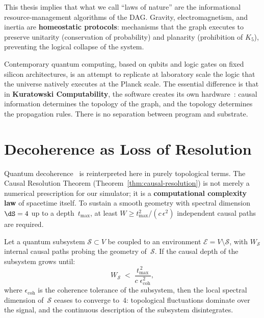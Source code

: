 \medskip\noindent
This thesis implies that what we call ``laws of nature'' are the
informational resource-management algorithms of the DAG. Gravity,
electromagnetism, and inertia are \textbf{homeostatic protocols}:
mechanisms that the graph executes to preserve unitarity (conservation of
probability) and planarity (prohibition of $K_5$), preventing the
logical collapse of the system.

Contemporary quantum computing, based on qubits and logic gates on fixed
silicon architectures, is an attempt to replicate at laboratory scale the
logic that the universe natively executes at the Planck scale. The
essential difference is that in \textbf{Kuratowski Computability}, the
software creates its own hardware~\cite{landauer1961}: causal information
determines the topology of the graph, and the topology determines the
propagation rules. There is no separation between program and substrate.

\section*{Decoherence as Loss of Resolution}

Quantum decoherence~\cite{zurek2003,zeh1970,joos2003} is reinterpreted
here in purely topological terms.
The Causal Resolution Theorem
(Theorem~\ref{thm:causal-resolution}) is not merely a numerical
prescription for our simulator; it is a \textbf{computational complexity
law} of spacetime itself. To sustain a smooth geometry with spectral
dimension $\dS = 4$ up to a depth~$t_{\max}$, at least
$W \geq t_{\max}^2 / (c\,\epsilon^2)$ independent causal paths are
required.

\begin{theorem}
\label{thm:decoherence-resolution}
Let a quantum subsystem $\mathcal{S} \subset V$ be coupled to an
environment $\mathcal{E} = V \setminus \mathcal{S}$, with
$W_{\mathcal{S}}$ internal causal paths probing the geometry
of~$\mathcal{S}$. If the causal depth of the subsystem grows until:
\begin{equation}
  W_{\mathcal{S}}
  \;<\;
  \frac{t_{\max}^{\,2}}{c\;\epsilon_{\text{coh}}^2},
  \label{eq:decoherence-threshold}
\end{equation}
where $\epsilon_{\text{coh}}$ is the coherence tolerance of the
subsystem, then the local spectral dimension of~$\mathcal{S}$ ceases to
converge to~$4$: topological fluctuations dominate over the signal, and
the continuous description of the subsystem disintegrates.
\end{theorem}

